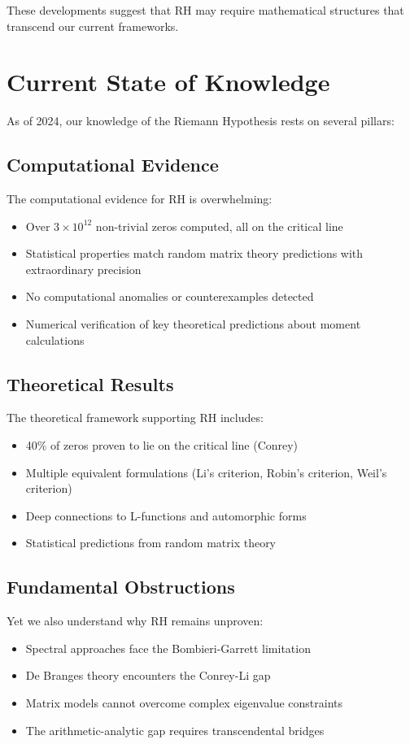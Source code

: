 These developments suggest that RH may require mathematical structures that transcend our current frameworks.

\section*{Current State of Knowledge}

As of 2024, our knowledge of the Riemann Hypothesis rests on several pillars:

\subsection*{Computational Evidence}

The computational evidence for RH is overwhelming:
\begin{itemize}
\item Over $3 \times 10^{12}$ non-trivial zeros computed, all on the critical line
\item Statistical properties match random matrix theory predictions with extraordinary precision  
\item No computational anomalies or counterexamples detected
\item Numerical verification of key theoretical predictions about moment calculations
\end{itemize}

\subsection*{Theoretical Results}

The theoretical framework supporting RH includes:
\begin{itemize}
\item 40\% of zeros proven to lie on the critical line (Conrey)
\item Multiple equivalent formulations (Li's criterion, Robin's criterion, Weil's criterion)
\item Deep connections to L-functions and automorphic forms
\item Statistical predictions from random matrix theory
\end{itemize}

\subsection*{Fundamental Obstructions}

Yet we also understand why RH remains unproven:
\begin{itemize}
\item Spectral approaches face the Bombieri-Garrett limitation
\item De Branges theory encounters the Conrey-Li gap
\item Matrix models cannot overcome complex eigenvalue constraints
\item The arithmetic-analytic gap requires transcendental bridges
\end{itemize}

